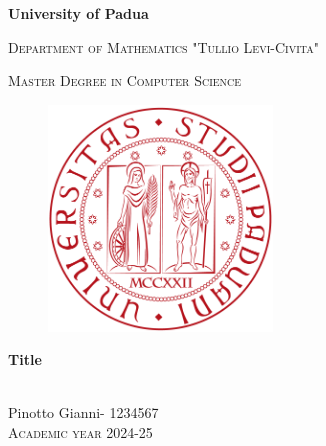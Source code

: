 \documentclass[a4paper,11pt]{report}
\begin{document}
\begin{titlepage}
    \begin{center}
        \begin{LARGE}
            \textbf{University of Padua}\\
        \end{LARGE}

        \vspace{10pt}

        \begin{Large}
            \textsc{Department of Mathematics "Tullio Levi-Civita"}\\
        \end{Large}

        \vspace{10pt}

        \begin{large}
            \textsc{Master Degree in Computer Science}\\
        \end{large}

        \vspace{30pt}
        \begin{figure}[htbp]
            \centering
            \includegraphics[height=6cm]{unipd-logo}
        \end{figure}
        \vspace{30pt}

        \begin{LARGE}
            \textbf{Title}\\
        \end{LARGE}

        \vspace{10pt}

        \begin{Large}
            \\
            \vspace{40pt}
            Pinotto Gianni\space- 1234567\\
            \vspace{10pt}
            \textsc{Academic year 2024-25}
        \end{Large}

        \begin{normalsize}
        \end{normalsize}
    \end{center}
\end{titlepage}
\end{document}
